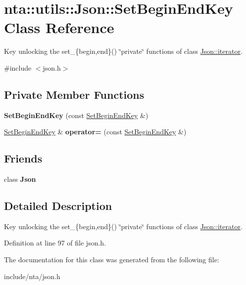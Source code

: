 \hypertarget{classnta_1_1utils_1_1Json_1_1SetBeginEndKey}{}\section{nta\+:\+:utils\+:\+:Json\+:\+:Set\+Begin\+End\+Key Class Reference}
\label{classnta_1_1utils_1_1Json_1_1SetBeginEndKey}


Key unlocking the set\+\_\+\{begin,end\}() \char`\"{}private\char`\"{} functions of class \hyperlink{classnta_1_1utils_1_1Json_1_1iterator}{Json\+::iterator}.  




{\ttfamily \#include $<$json.\+h$>$}

\subsection*{Private Member Functions}
\begin{DoxyCompactItemize}
\item 
\mbox{\label{classnta_1_1utils_1_1Json_1_1SetBeginEndKey_a8b763786a663ac1f4480536569502b03}} 
{\bfseries Set\+Begin\+End\+Key} (const \hyperlink{classnta_1_1utils_1_1Json_1_1SetBeginEndKey}{Set\+Begin\+End\+Key} \&)
\item 
\mbox{\label{classnta_1_1utils_1_1Json_1_1SetBeginEndKey_acedfb4474597563556da2ae4df424e5e}} 
\hyperlink{classnta_1_1utils_1_1Json_1_1SetBeginEndKey}{Set\+Begin\+End\+Key} \& {\bfseries operator=} (const \hyperlink{classnta_1_1utils_1_1Json_1_1SetBeginEndKey}{Set\+Begin\+End\+Key} \&)
\end{DoxyCompactItemize}
\subsection*{Friends}
\begin{DoxyCompactItemize}
\item 
\mbox{\label{classnta_1_1utils_1_1Json_1_1SetBeginEndKey_a7dd8a79e9210a2a230d000eee63c6e8a}} 
class {\bfseries Json}
\end{DoxyCompactItemize}


\subsection{Detailed Description}
Key unlocking the set\+\_\+\{begin,end\}() \char`\"{}private\char`\"{} functions of class \hyperlink{classnta_1_1utils_1_1Json_1_1iterator}{Json\+::iterator}. 

Definition at line 97 of file json.\+h.



The documentation for this class was generated from the following file\+:\begin{DoxyCompactItemize}
\item 
include/nta/json.\+h\end{DoxyCompactItemize}
